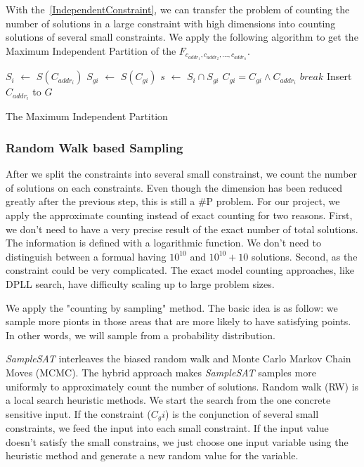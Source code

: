 With the~\ref{IndependentConstraint}, we can transfer the problem of counting the number of 
solutions in a large constraint with high
dimensions into counting solutions of 
several small constraints. We apply the following algorithm to get the Maximum Independent Partition
of the $F_{c_{addr_1},c_{addr_2},...,c_{addr_n}}$.

\IncMargin{1em}
\begin{algorithm}[h]
\DontPrintSemicolon
{}
{
   $S_i$ $\leftarrow$ $S(C_{addr_i})$ \;
   {
   $S_{gi}$ $\leftarrow$ $S(C_{gi})$ \;
   $s$ $\leftarrow$ $S_i \cap S_{gi}$  \;
   {
      $C_{gi} = C_{gi} \land C_{addr_i}$ \;
      $break$ \;
   }
   Insert $C_{{addr}_i}$ to $G$
   }
}
\caption{The Maximum Independent Partition}
\end{algorithm}
\DecMargin{1em}

\subsubsection{Random Walk based Sampling}

After we split the constraints into several small constrainst, we count
the number of solutions on each constraints. Even though the dimension
has been reduced greatly after the previous step, this is still a
\#P problem. For our project, we apply the approximate counting instead of
exact counting for two reasons. First, we don't need to have a very precise
result of the exact number of total solutions. The information is defined with
a logarithmic function. We don't need to distinguish between a formual having
$10^{10}$ and $10^{10} + 10$ solutions.
Second, as the constraint could be very complicated. The exact model counting
approaches, like DPLL search, have difficulty scaling up to large problem sizes.

We apply the "counting by sampling" method. The basic idea is as follow: we 
sample more pionts in those areas that are more likely to have satisfying
points. In other words, we will sample from a probability distribution. 

\textit{SampleSAT} interleaves
the biased random walk and Monte Carlo Markov Chain Moves (MCMC). The hybrid
approach makes \textit{SampleSAT} samples more uniformly to
approximately count the number of solutions. Random walk (RW) is a 
local search heuristic methods. We start the search from
the one concrete sensitive input. If the constraint ($C_gi$) is the conjunction
of several small constraints, we feed the input into each small constraint. If 
the input value doesn't satisfy the small constrains, we just choose one input 
variable using the heuristic method and generate a new random value for the variable.

